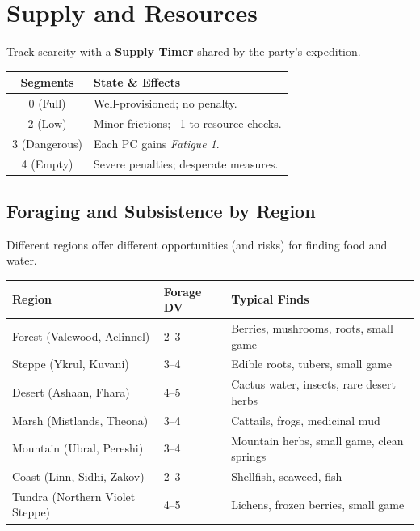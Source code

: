 \section{Supply and Resources}
\label{sec:supply}

Track scarcity with a \textbf{Supply Timer } shared by the party's expedition.
\begin{center}
\begin{longtable}{cl}
\toprule
\textbf{Segments} & \textbf{State \& Effects} \\
\midrule
0 (Full) & Well-provisioned; no penalty. \\
2 (Low) & Minor frictions; --1 to resource checks. \\
3 (Dangerous) & Each PC gains \emph{Fatigue 1}. \\
4 (Empty) & Severe penalties; desperate measures. \\
\bottomrule
\end{longtable}
\end{center}

\subsection*{Foraging and Subsistence by Region}
\label{sec:foraging}

Different regions offer different opportunities (and risks) for finding food and water.

\begin{center}
\begin{longtable}{lll}
\toprule
\textbf{Region} & \textbf{Forage DV} & \textbf{Typical Finds} \\
\midrule
Forest (Valewood, Aelinnel) & 2--3 & Berries, mushrooms, roots, small game \\
Steppe (Ykrul, Kuvani) & 3--4 & Edible roots, tubers, small game \\
Desert (Ashaan, Fhara) & 4--5 & Cactus water, insects, rare desert herbs \\
Marsh (Mistlands, Theona) & 3--4 & Cattails, frogs, medicinal mud \\
Mountain (Ubral, Pereshi) & 3--4 & Mountain herbs, small game, clean springs \\
Coast (Linn, Sidhi, Zakov) & 2--3 & Shellfish, seaweed, fish \\
Tundra (Northern Violet Steppe) & 4--5 & Lichens, frozen berries, small game \\
\bottomrule
\end{longtable}
\end{center}

